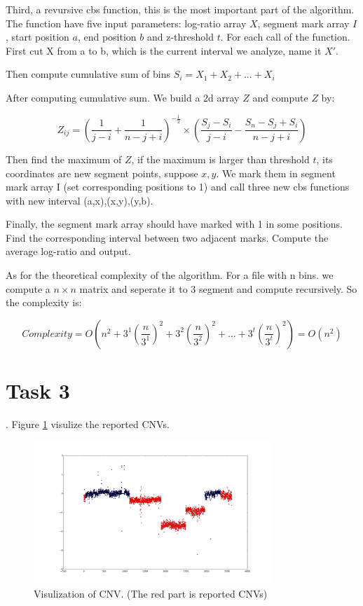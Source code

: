 \documentclass[a4paper]{article}
\begin{document}
Third, a revursive cbs function, this is the most important part of the algorithm. The function have five input parameters: log-ratio array $X$, segment mark array $I$, start position $a$, end position $b$ and z-threshold $t$. For each call of the function. First cut X from a to b, which is the current interval we analyze, name it $X'$. 

Then compute cumulative sum of bins $S_i = X_1+X_2+...+X_i$

After computing cumulative sum. We build a 2d array $Z$ and compute $Z$ by:

\begin{equation*}
Z_{ij}=(\frac{1}{j-i}+\frac{1}{n-j+i})^{-\frac{1}{2}}\times (\frac{S_j-S_i}{j-i}-\frac{S_n-S_j+S_i}{n-j+i})
\end{equation*}

Then find the maximum of $Z$, if the maximum is larger than threshold $t$, its coordinates are new segment points, suppose $x,y$. We mark them in segment mark array I (set corresponding positions to 1) and call three new cbs functions with new interval (a,x),(x,y),(y,b).

Finally, the segment mark array should have marked with 1 in some positions. Find the corresponding interval between two adjacent marks. Compute the average log-ratio and output.

As for the theoretical complexity of the algorithm. For a file with n bins. we compute a $n\times n$ matrix and seperate it to 3 segment and compute recursively. So the complexity is:

\begin{equation*}
Complexity = O(n^2 + 3^{1}(\frac{n}{3^{1}})^2 + 3^{2}(\frac{n}{3^{2}})^2+...+3^{t}(\frac{n}{3^{t}})^2)=O(n^2)
\end{equation*}

\section{Task 3}

. Figure \ref{fig} visulize the reported CNVs.

\begin{figure}[h]
	\centering
		\includegraphics[width=0.8\textwidth]{snv.png}
	\caption{Visulization of CNV. (The red part is reported CNVs)}
	\label{fig} 
\end{figure}
\end{document}

